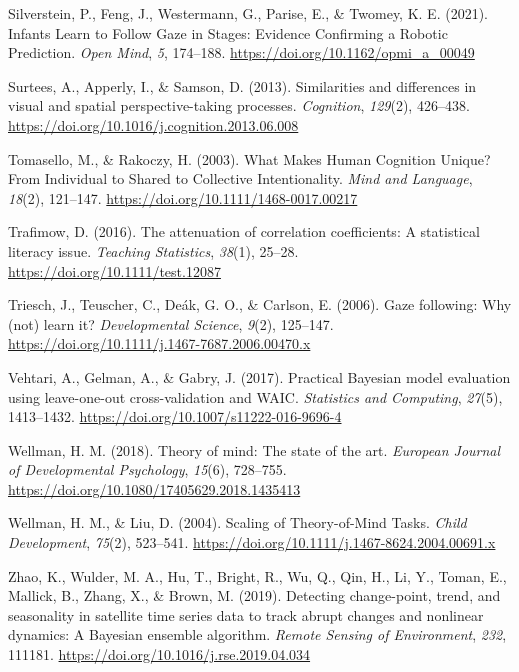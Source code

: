 \documentclass[
  man,mask,floatsintext]{apa7}
\newlength{\cslhangindent}
\newlength{\cslentryspacingunit} %
\newenvironment{CSLReferences}[2] %
 {%
  \setlength{\parindent}{0pt}
  \ifodd #1
  \let\oldpar\par
  \def\par{\hangindent=\cslhangindent\oldpar}
  \fi
  \setlength{\parskip}{#2\cslentryspacingunit}
 }%
 {}
\begin{document}
\begin{CSLReferences}{1}{0}
\leavevmode{}%
Silverstein, P., Feng, J., Westermann, G., Parise, E., \& Twomey, K. E. (2021). Infants {Learn} to {Follow Gaze} in {Stages}: {Evidence Confirming} a {Robotic Prediction}. \emph{Open Mind}, \emph{5}, 174--188. \url{https://doi.org/10.1162/opmi_a_00049}

\leavevmode{}%
Surtees, A., Apperly, I., \& Samson, D. (2013). Similarities and differences in visual and spatial perspective-taking processes. \emph{Cognition}, \emph{129}(2), 426--438. \url{https://doi.org/10.1016/j.cognition.2013.06.008}

\leavevmode{}%
Tomasello, M., \& Rakoczy, H. (2003). What {Makes Human Cognition Unique}? {From Individual} to {Shared} to {Collective Intentionality}. \emph{Mind and Language}, \emph{18}(2), 121--147. \url{https://doi.org/10.1111/1468-0017.00217}

\leavevmode{}%
Trafimow, D. (2016). The attenuation of correlation coefficients: A statistical literacy issue. \emph{Teaching Statistics}, \emph{38}(1), 25--28. \url{https://doi.org/10.1111/test.12087}

\leavevmode{}%
Triesch, J., Teuscher, C., Deák, G. O., \& Carlson, E. (2006). Gaze following: Why (not) learn it? \emph{Developmental Science}, \emph{9}(2), 125--147. \url{https://doi.org/10.1111/j.1467-7687.2006.00470.x}

\leavevmode{}%
Vehtari, A., Gelman, A., \& Gabry, J. (2017). Practical {Bayesian} model evaluation using leave-one-out cross-validation and {WAIC}. \emph{Statistics and Computing}, \emph{27}(5), 1413--1432. \url{https://doi.org/10.1007/s11222-016-9696-4}

\leavevmode{}%
Wellman, H. M. (2018). Theory of mind: {The} state of the art. \emph{European Journal of Developmental Psychology}, \emph{15}(6), 728--755. \url{https://doi.org/10.1080/17405629.2018.1435413}

\leavevmode{}%
Wellman, H. M., \& Liu, D. (2004). Scaling of {Theory-of-Mind Tasks}. \emph{Child Development}, \emph{75}(2), 523--541. \url{https://doi.org/10.1111/j.1467-8624.2004.00691.x}

\leavevmode{}%
Zhao, K., Wulder, M. A., Hu, T., Bright, R., Wu, Q., Qin, H., Li, Y., Toman, E., Mallick, B., Zhang, X., \& Brown, M. (2019). Detecting change-point, trend, and seasonality in satellite time series data to track abrupt changes and nonlinear dynamics: {A Bayesian} ensemble algorithm. \emph{Remote Sensing of Environment}, \emph{232}, 111181. \url{https://doi.org/10.1016/j.rse.2019.04.034}


\end{CSLReferences}
\end{document}

